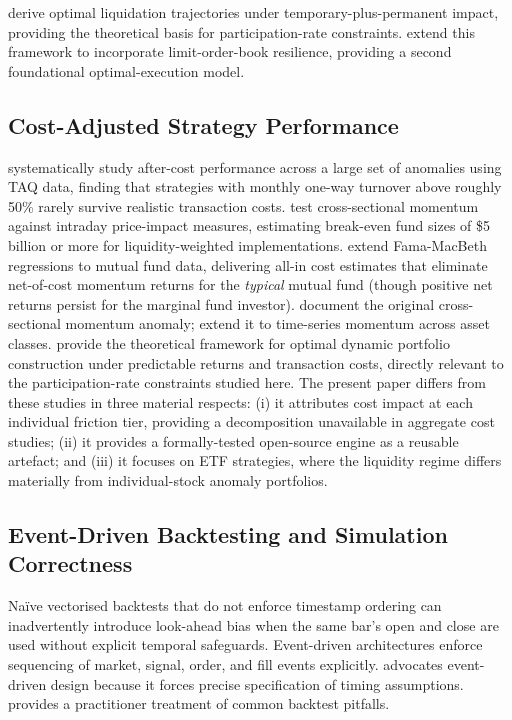 \documentclass[12pt]{article}
\begin{document}
\citet{almgren2001optimal} derive optimal liquidation trajectories under
temporary-plus-permanent impact, providing the theoretical basis for
participation-rate constraints. \citet{obizhaeva2013optimal} extend this
framework to incorporate limit-order-book resilience, providing a second
foundational optimal-execution model.

\subsection{Cost-Adjusted Strategy Performance}

\citet{novymarx2016taxonomy} systematically study after-cost performance
across a large set of anomalies using TAQ data, finding that strategies
with monthly one-way turnover above roughly 50\% rarely survive realistic
transaction costs. \citet{korajczyk2004momentum} test cross-sectional
momentum against intraday price-impact measures, estimating break-even
fund sizes of \$5 billion or more for liquidity-weighted implementations.
\citet{patton2020costs} extend Fama-MacBeth regressions to mutual fund
data, delivering all-in cost estimates that eliminate net-of-cost momentum
returns for the \emph{typical} mutual fund (though positive net returns
persist for the marginal fund investor). \citet{jegadeesh1993returns} document the
original cross-sectional momentum anomaly; \citet{moskowitz2012time}
extend it to time-series momentum across asset classes.
\citet{garleanu2013dynamic} provide the theoretical framework for
optimal dynamic portfolio construction under predictable returns and
transaction costs, directly relevant to the participation-rate
constraints studied here. The present paper
differs from these studies in three material respects: (i) it attributes
cost impact at each individual friction tier, providing a decomposition
unavailable in aggregate cost studies; (ii) it provides a formally-tested
open-source engine as a reusable artefact; and (iii) it focuses on ETF
strategies, where the liquidity regime differs materially from
individual-stock anomaly portfolios.

\subsection{Event-Driven Backtesting and Simulation Correctness}

Na\"{i}ve vectorised backtests that do not enforce timestamp ordering
can inadvertently introduce look-ahead bias when the same bar's open
and close are used without explicit temporal safeguards.
Event-driven architectures \citep{zipline} enforce sequencing of
market, signal, order, and fill events explicitly.
\citet{lopezdeprado2018advances} advocates event-driven design because
it forces precise specification of timing assumptions.
\citet{chan2013algorithmic} provides a practitioner treatment of
common backtest pitfalls.
\end{document}
